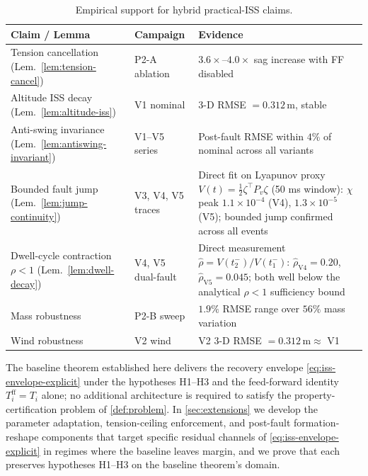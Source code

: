 \begin{table}[t]
  \centering
  \caption{Empirical support for hybrid practical-ISS claims.}
  \label{tab:stability-evidence}
  \small
  \renewcommand{\arraystretch}{1.05}
  \begin{tabular}{p{5.5cm}p{2.5cm}p{8cm}}
    \toprule
    Claim / Lemma & Campaign & Evidence \\
    \midrule
    Tension cancellation (Lem.~\ref{lem:tension-cancel})
      & P2-A ablation
      & $3.6\times$--$4.0\times$ sag increase with FF disabled \\
    Altitude ISS decay (Lem.~\ref{lem:altitude-iss})
      & V1 nominal
      & 3-D RMSE $= 0.312\,\mathrm{m}$, stable \\
    Anti-swing invariance (Lem.~\ref{lem:antiswing-invariant})
      & V1--V5 series
      & Post-fault RMSE within $4\%$ of nominal
        across all variants \\
    Bounded fault jump (Lem.~\ref{lem:jump-continuity})
      & V3, V4, V5 traces
      & Direct fit on Lyapunov proxy
        $V(t) = \frac{1}{2}\zeta^\top P_v \zeta$ (50 ms window):
        $\hat\chi$ peak $1.1\!\times\!10^{-4}$ (V4),
        $1.3\!\times\!10^{-5}$ (V5);
        bounded jump confirmed across all events \\
    Dwell-cycle contraction $\rho < 1$
      (Lem.~\ref{lem:dwell-decay})
      & V4, V5 dual-fault
      & Direct measurement
        $\hat\rho = V(t_2^-)/V(t_1^-)$:
        $\hat\rho_{\text{V4}} = 0.20$,
        $\hat\rho_{\text{V5}} = 0.045$;
        both well below the analytical $\rho < 1$
        sufficiency bound \\
    Mass robustness
      & P2-B sweep
      & $1.9\%$ RMSE range over $56\%$ mass variation \\
    Wind robustness
      & V2 wind
      & V2 3-D RMSE $= 0.312\,\mathrm{m} \approx$ V1 \\
    \bottomrule
  \end{tabular}
\end{table}

The baseline theorem established here delivers the recovery envelope \eqref{eq:iss-envelope-explicit} under the hypotheses H1--H3 and the feed-forward identity $T_i^{\mathrm{ff}} = T_i$ alone; no additional architecture is required to satisfy the property-certification problem of \cref{def:problem}. In \cref{sec:extensions} we develop the parameter adaptation, tension-ceiling enforcement, and post-fault formation-reshape components that target specific residual channels of \eqref{eq:iss-envelope-explicit} in regimes where the baseline leaves margin, and we prove that each preserves hypotheses H1--H3 on the baseline theorem's domain.
